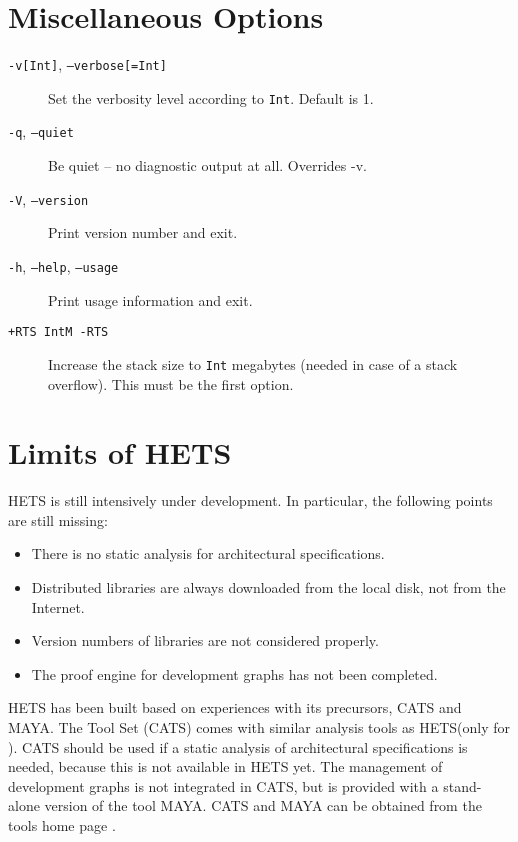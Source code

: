 \documentclass{article}
\newcommand{\normalTEXTSC}[2]{{#1\scriptsize#2}}
\newcommand     {\MAYA}{\normalTEXTSC{M}{AYA}\xspace}
\newcommand     {\Hets}{\normalTEXTSC{H}{ETS}\xspace}
\newcommand     {\Cats}{\normalTEXTSC{C}{ATS}\xspace}
\begin{document}
\section{Miscellaneous Options}

\begin{description}
\item[\texttt{-v[Int]}, \texttt{--verbose[=Int]}] 
Set the verbosity level according to \texttt{Int}. Default is 1.
\item[\texttt{-q}, \texttt{--quiet}] 
Be quiet -- no diagnostic output at all. Overrides -v.
\item[\texttt{-V}, \texttt{--version}] Print version number and exit.
\item[\texttt{-h}, \texttt{--help}, \texttt{--usage}]  
Print usage information and exit.
\item[\texttt{+RTS IntM -RTS}] Increase the stack size to 
 \texttt{Int} megabytes (needed in case of a stack overflow). 
This must be the first option.
\end{description}


\section{Limits of \Hets}

\Hets is still intensively under development. In particular, the
following points are still missing:

\begin{itemize}
\item There is no static analysis for architectural specifications.
\item Distributed libraries are always downloaded from the local disk,
not from the Internet.
\item Version numbers of libraries are not considered properly.
\item The proof engine for development graphs has not been completed.
\end{itemize}

\Hets has been built based on experiences with its
precursors, 
                \index{Cats@\Cats}%
\Cats and 
                \index{Maya@\MAYA}%
\MAYA.
The \CASL Tool Set (\Cats) 
\cite{Mossakowski:2000:CST,Mossakowski:1998:SSA}
comes with similar analysis tools as \Hets (only for \CASL).
\Cats should be used if a static analysis of architectural
specifications is needed, because this is not available
in \Hets yet.
The management of development graphs is not integrated
in \Cats, 
but is provided with a stand-alone version of the
tool \MAYA \cite{Autexier:2002:IHD,AutexierEtal02}. 
%
\Cats and \MAYA 
 can be obtained from the \CoFI tools home page \cite{CoFITools}.
\end{document}
